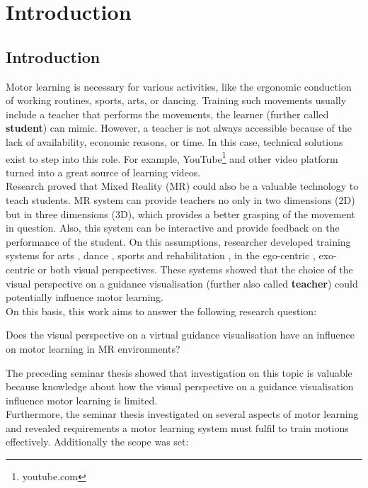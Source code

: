 \chapter{Introduction}

\section{Introduction}
Motor learning is necessary for various activities, like the ergonomic conduction of working routines, sports, arts, or dancing. Training such movements usually include a teacher that performs the movements, the learner (further called \textbf{student}) can mimic. However, a teacher is not always accessible because of the lack of availability, economic reasons, or time. In this case, technical solutions exist to step into this role. For example, YouTube\footnote{youtube.com} and other video platform turned into a great source of learning videos.\\
Research proved that Mixed Reality (MR) could also be a valuable technology to teach students. MR system can provide teachers no only in two dimensions (2D) but in three dimensions (3D), which provides a better grasping of the movement in question. Also, this system can be interactive and provide feedback on the performance of the student. On this assumptions, researcher developed training systems for arts \cite{Han2016, Komura2006, Chua}, dance \cite{Yan2015, Chan2010, Hachimura2004}, sports \cite{Covaci2014, Kojima2014} and rehabilitation \cite{Chinthammit2014, Tang2015, Rajanna2015}, in the ego-centric \cite{Yang2002, Katzakis2017, Scavo2015}, exo-centric \cite{Han2017, Velloso2013, Lieberman2007} or both \cite{Sousa2016, Hoang2016, Sodhi2012} visual perspectives. These systems showed that the choice of the visual perspective on a guidance visualisation (further also called \textbf{teacher}) could potentially influence motor learning.\\
On this basis, this work aims to answer the following research question:
\begin{tcolorbox}[colback=red!30!white]
	Does the visual perspective on a virtual guidance visualisation have an influence on motor learning in MR environments?
\end{tcolorbox}
The preceding seminar thesis showed that investigation on this topic is valuable because knowledge about how the visual perspective on a guidance visualisation influence motor learning is limited.\\
Furthermore, the seminar thesis investigated on several aspects of motor learning and revealed requirements a motor learning system must fulfil to train motions effectively. Additionally the scope was set:
